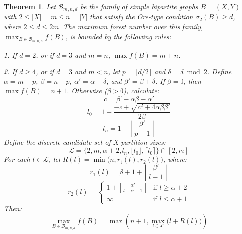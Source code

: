 \documentclass[10pt,a4paper]{amsart}
\newtheorem{theorem}{Theorem}[section]
\begin{document}
\begin{theorem} \label{thm:main}
Let $\mathcal{B}_{m,n,d}$ be the family of simple bipartite graphs $B = (X, Y)$ with $2 \le |X| = m \le n = |Y|$ that satisfy the Ore-type condition $\sigma_2(B) \ge d$, where $2 \le d \le 2m$.
The maximum forest number over this family, $\max_{B \in \mathcal{B}_{m,n,d}} f(B)$, is bounded by the following rules:

1. If $d = 2$, or if $d = 3$ and $m = n$, $\max f(B) = m + n$.

2. If $d \ge 4$, or if $d = 3$ and $m < n$, let $p = \lceil d/2 \rceil$ and $\delta = d \bmod 2$. Define $\alpha = m - p$, $\beta = n - p$, $\alpha' = \alpha + \delta$, and $\beta' = \beta + \delta$.
If $\beta = 0$, then $\max f(B) = n + 1$.
Otherwise ($\beta > 0$), calculate:
\[ c = \beta' - \alpha \beta - \alpha' \]
\[ l_0 = 1 + \frac{-c + \sqrt{c^2 + 4 \alpha \beta \beta'}}{2\beta} \]
\[ l_n = 1 + \left\lfloor \frac{\beta'}{p-1} \right\rfloor \]
Define the discrete candidate set of $X$-partition sizes:
\[ \mathcal{L} = \Big\{ 2, m, \alpha+2, l_n, \lfloor l_0 \rfloor, \lceil l_0 \rceil \Big\} \cap [2, m] \]
For each $l \in \mathcal{L}$, let $R(l) = \min \big( n, r_1(l), r_2(l) \big)$, where:
\[ r_1(l) = \beta + 1 + \left\lfloor \frac{\beta'}{l-1} \right\rfloor \]
\[ r_2(l) = \begin{cases} 1 + \left\lfloor \frac{\alpha'}{l - \alpha - 1} \right\rfloor & \text{if } l \ge \alpha + 2 \\ \infty & \text{if } l \le \alpha + 1 \end{cases} \]
Then:
\[ \max_{B \in \mathcal{B}_{m,n,d}} f(B) = \max \left( n+1, \max_{l \in \mathcal{L}} \big(l + R(l)\big) \right) \]
\end{theorem}
\end{document}

